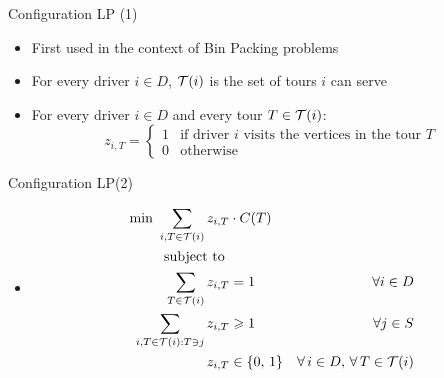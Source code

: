 \begin{frame}[t]{Configuration LP (1)}
    \begin{itemize}
        \item<1-> First used in the context of Bin Packing problems
        \item<2-> For every driver $i \in D$, $\mathcal{T}(i)$ is the set of tours $i$ can serve        
        \item<3-> For every driver $i \in D$ and every tour $T \in \mathcal{T}(i)$:
        \[
            z_{i, T} =
                \begin{cases}
                    1 & \text{if driver $i$ visits the vertices in the tour $T$} \\
                    0 & \text{otherwise}
                \end{cases}
        \]
    \end{itemize}
\end{frame}


\begin{frame}[t]{Configuration LP(2)}
    \label{CLP2}
    \begin{itemize}
        \item<1->[ ] \begin{align}
            \text {min } \label{cg_obj}	 \sum_{ i, 	T \in \mathcal{T}(i) } z_{i, T} & \cdot C(T) &    &  \\
            \text{subject to }             & & \nonumber  \\
            \label{const:cg1}       \sum_{ T \in \mathcal{T}(i) } z_{ i, T } & = 1  &   \forall i \in D \\
            \label{const:cg2}       \sum_{ i, T \in \mathcal{T}(i): T \ni j } z_{ i, T } & \geqslant 1   &   \forall j \in S \\
            \label{consT:cg3}       z_{ i, T } & \in \{0,\, 1\}    & \forall \, i \in D, \, \forall \, T \in \mathcal{T}(i) 
        \end{align}        
    \end{itemize}
\end{frame}

